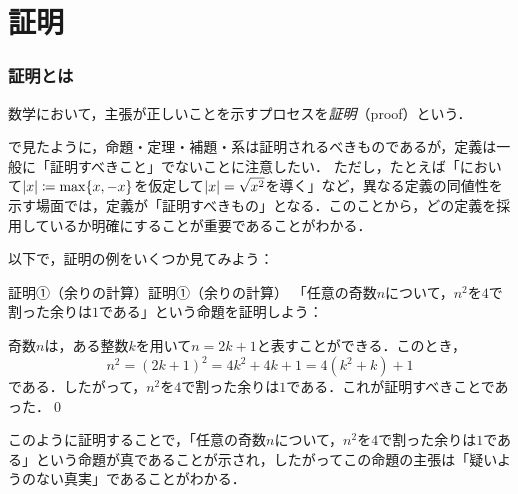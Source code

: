 \part{証明}

\begin{abstract}
この章では，前章で整理した論理を踏まえて，数学の議論の中心である「証明」を扱う．まず証明とはなにかを確認し，帰納法・背理法・直接証明・対偶法・場合分けや反例による反証といったさまざまな証明法を具体例とともに見ていく．数学的帰納法については，その原理と累積帰納法もあわせて述べる．そのうえで，数学的主張の骨格をなす「存在」と「一意性」について，「数学では何を証明しなければならないのか」という観点から具体例をもとに整理し，構成的・非構成的な存在証明や一意性の示し方にも触れよう．
\end{abstract}

\section{証明とは}
数学において，主張が正しいことを示すプロセスを\emph{証明}（proof）という．

\begin{remark}
  で見たように，命題・定理・補題・系は証明されるべきものであるが，定義は一般に「証明すべきこと」でないことに注意したい．
  ただし，たとえば「において$\lvert x\rvert \coloneqq \max \{ x, -x \}$を仮定して$\lvert x\rvert = \sqrt{x^2}$を導く」など，異なる定義の同値性を示す場面では，定義が「証明すべきもの」となる．このことから，どの定義を採用しているか明確にすることが重要であることがわかる．
\end{remark}

以下で，証明の例をいくつか見てみよう：


\begin{example}{証明①（余りの計算）}{証明①（余りの計算）}
  「任意の奇数$n$について，$n^2$を$4$で割った余りは$1$である」という命題を証明しよう：

  奇数$n$は，ある整数$k$を用いて$n = 2k + 1$と表すことができる．このとき，
\[
  n^2 = (2k + 1)^2 = 4k^2 + 4k + 1 = 4(k^2 + k) + 1
\]
である．したがって，$n^2$を$4$で割った余りは$1$である．これが証明すべきことであった．\qed
\end{example}

このように証明することで，「任意の奇数$n$について，$n^2$を$4$で割った余りは$1$である」という命題が真であることが示され，したがってこの命題の主張は「疑いようのない真実」であることがわかる．

